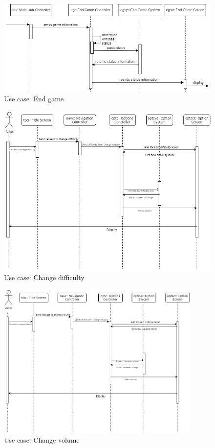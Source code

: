 \documentclass[]{article}
\begin{document}
\begin{figure}[H]
    \centering
    \includegraphics[width=\textwidth]{sequenceDiagrams/end_game.png}
    \caption{Use case: End game}
    \label{fig:seq_end_game}
\end{figure}

\begin{figure}[H]
    \centering
    \includegraphics[width=\textwidth]{D3/sequenceDiagrams/change_diff.jpg}
    \caption{Use case: Change difficulty}
    \label{fig:seq_change_diff}
\end{figure}

\begin{figure}[H]
    \centering
    \includegraphics[width=0.9\textwidth]{D3/sequenceDiagrams/change_vol.jpg}
    \caption{Use case: Change volume}
    \label{fig:seq_change_vol}
\end{figure}
\end{document}
